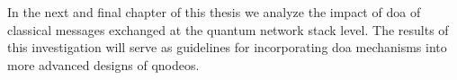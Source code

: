 In the next and final chapter of this thesis we analyze the impact of \acrlong{doa} of classical
messages exchanged at the quantum network stack level. The results of this investigation will serve
as guidelines for incorporating \acrlong{doa} mechanisms into more advanced designs of
\acrshort{qnodeos}.

\begin{xstretch}
\printbibliography[heading=subbibintoc,title={References},notcategory=noprint]
\end{xstretch}
